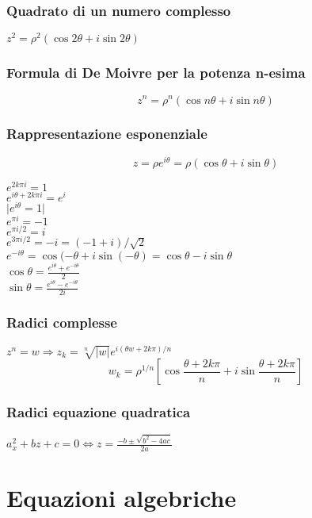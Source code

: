 \documentclass[a4paper,12pt]{article}
\theoremstyle{mystyle}
\begin{document}
\subsubsection{Quadrato di un numero complesso}
\(z^2 = \rho^2 (\cos 2 \theta + i \sin 2 \theta)\)

\subsubsection{Formula di De Moivre per la potenza n-esima}
\[z^n = \rho^n (\cos n \theta + i\sin n\theta)\]

\subsubsection{Rappresentazione esponenziale}
\[z = \rho e^{i \theta} = \rho (\cos \theta + i \sin \theta)\]

\(e^{2k \pi i} = 1 \)\\
\(e^{i \theta + 2k \pi i} = e^i \)\\
\(\lvert e^{i \theta} = 1 \rvert \)\\
\(e^{\pi i} = -1 \)\\
\(e^{\pi i / 2} = i \)\\
\(e^{3 \pi i /2} = - i = (-1 + i) /\sqrt 2 \)\\
\(e^{-i \theta}= \cos(-\theta + i \sin (-\theta) = \cos \theta - i \sin \theta \)\\
\(\cos \theta = \frac{e^{i \theta} + e^{-i \theta}}{2} \)\\
\(\sin \theta = \frac{e^{i \theta}-e^{-i \theta}}{2i} \)

\subsubsection{Radici complesse}
\(z^n = w \Rightarrow z_k = \sqrt[n]{\lvert w \rvert} e^{i(\theta w + 2k \pi)/n} \)\\
\[w_k = \rho^{1/n} \left[ \cos \frac{\theta + 2k \pi}{n} + i \sin \frac{\theta + 2k \pi}{n} \right] \]

\subsubsection{Radici equazione quadratica}
\(a_x^2 + bz + c = 0 \Leftrightarrow z = \frac{-b \pm \sqrt{b^2 - 4ac}}{2a} \)



\newpage

\section{Equazioni algebriche}
\end{document}
